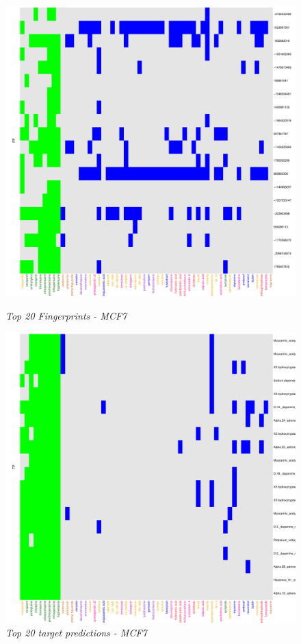 \documentclass[a4paper]{article}
\begin{document}
\begin{figure}[H]
  \begin{minipage}[b]{.5\linewidth}
     \centering
\includegraphics{IntClustVignette-FeaturesPlotF}
\caption{{\it Top 20 Fingerprints - MCF7}\label{MCF7_F}}
\end{minipage}%
  \begin{minipage}[b]{.5\linewidth}
     \centering
\includegraphics{IntClustVignette-FeaturesPlotT}
\caption{{\it Top 20 target predictions - MCF7}\label{MCF7_F}}
\end{minipage}
\end{figure}
\newpage


\newpage
\end{document}
